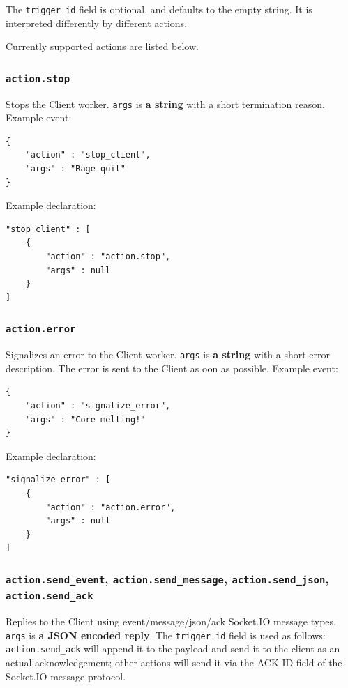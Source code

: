\documentclass[a4paper]{article}
\begin{document}
\noindent
The \texttt{trigger\_id} field is optional, and defaults to the empty string. It is interpreted differently by different actions.

\noindent
Currently supported actions are listed below.
\subsubsection{\texttt{action.stop}}
\label{sec-9-3-1}

Stops the Client worker. \texttt{args} is \textbf{a string} with a short termination reason. Example event:


\begin{verbatim}
{
    "action" : "stop_client",
    "args" : "Rage-quit"
}
\end{verbatim}




\noindent
Example declaration:

\begin{verbatim}
"stop_client" : [
    {
        "action" : "action.stop",
        "args" : null
    }
]
\end{verbatim}
\subsubsection{\texttt{action.error}}
\label{sec-9-3-2}

Signalizes an error to the Client worker. \texttt{args} is \textbf{a string} with a short error description. The error is sent to the Client as oon as possible. Example event:


\begin{verbatim}
{
    "action" : "signalize_error",
    "args" : "Core melting!"
}
\end{verbatim}




\noindent
Example declaration:

\begin{verbatim}
"signalize_error" : [
    {
        "action" : "action.error",
        "args" : null
    }
]
\end{verbatim}
\subsubsection{\texttt{action.send\_event}, \texttt{action.send\_message}, \texttt{action.send\_json}, \texttt{action.send\_ack}}
\label{sec-9-3-3}

Replies to the Client using event/message/json/ack Socket.IO message types. \texttt{args} is \textbf{a JSON encoded reply}. The \texttt{trigger\_id} field is used as follows:  \texttt{action.send\_ack} will append it to the payload and send it to the client as an actual acknowledgement; other actions will send it via the ACK ID field of the Socket.IO message protocol.
\end{document}
